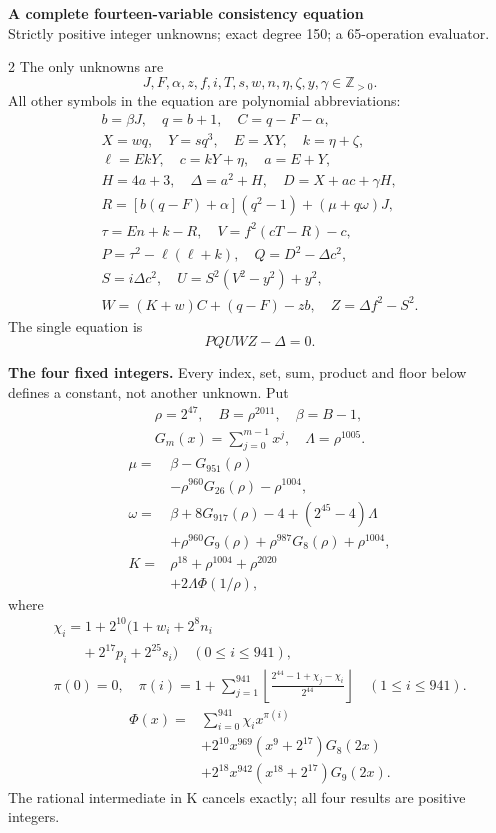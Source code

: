 \documentclass[10pt]{article}
\newcommand{\fl}[1]{\left\lfloor#1\right\rfloor}
\begin{document}
\begin{center}
{\large\bfseries A complete fourteen-variable consistency equation}\\[-1pt]
{\small Strictly positive integer unknowns; exact degree 150; a 65-operation evaluator.}
\end{center}\vspace{-8pt}
\begin{multicols}{2}
\fontsize{9}{9.5}\selectfont
The only unknowns are
\[
J,F,\alpha,z,f,i,T,s,w,n,\eta,\zeta,y,\gamma\in\mathbb Z_{>0}.
\]
All other symbols in the equation are polynomial abbreviations:
\[
\begin{gathered}
b=\beta J,\quad q=b+1,\quad C=q-F-\alpha,\\
X=wq,\quad Y=sq^3,\quad E=XY,\quad k=\eta+\zeta,\\
\ell=EkY,\quad c=kY+\eta,\quad a=E+Y,\\
H=4a+3,\quad\Delta=a^2+H,\quad D=X+ac+\gamma H,\\
R=[b(q-F)+\alpha](q^2-1)+(\mu+q\omega)J,\\
\tau=En+k-R,\quad V=f^2(cT-R)-c,\\
P=\tau^2-\ell(\ell+k),\quad Q=D^2-\Delta c^2,\\
S=i\Delta c^2,\quad U=S^2(V^2-y^2)+y^2,\\
W=(K+w)C+(q-F)-zb,\quad Z=\Delta f^2-S^2.
\end{gathered}
\]
The single equation is
\[
\boxed{PQUWZ-\Delta=0.}
\]

\textbf{The four fixed integers.}
Every index, set, sum, product and floor below defines a constant, not
another unknown. Put
\[
\begin{gathered}
\rho=2^{47},\quad B=\rho^{2011},\quad\beta=B-1,\\
G_m(x)=\sum_{j=0}^{m-1}x^j,\quad
\Lambda=\rho^{1005}.
\end{gathered}
\]
\begin{align*}
\mu={}&\beta-G_{951}(\rho)\\
&-\rho^{960}G_{26}(\rho)-\rho^{1004},\\
\omega={}&\beta+8G_{917}(\rho)-4+(2^{45}-4)\Lambda\\
&+\rho^{960}G_9(\rho)+\rho^{987}G_8(\rho)
  +\rho^{1004},\\
K={}&\rho^{18}+\rho^{1004}+\rho^{2020}\\
&+2\Lambda\Phi(1/\rho),
\end{align*}
where
\[
\begin{gathered}
\chi_i=1+2^{10}(1+w_i+2^8n_i\\
\qquad+2^{17}p_i+2^{25}s_i)\quad(0\le i\le941),\\
\pi(0)=0,\quad\pi(i)=1+\sum_{j=1}^{941}
\fl{\frac{2^{44}-1+\chi_j-\chi_i}{2^{44}}}\quad(1\le i\le941).
\end{gathered}
\]
\[
\begin{split}
\Phi(x)={}&\sum_{i=0}^{941}\chi_i x^{\pi(i)}\\
&+2^{10}x^{969}(x^9+2^{17})G_8(2x)\\
&+2^{18}x^{942}(x^{18}+2^{17})G_9(2x).
\end{split}
\]
The rational intermediate in K cancels exactly; all four results are positive integers.


\end{multicols}
\end{document}
